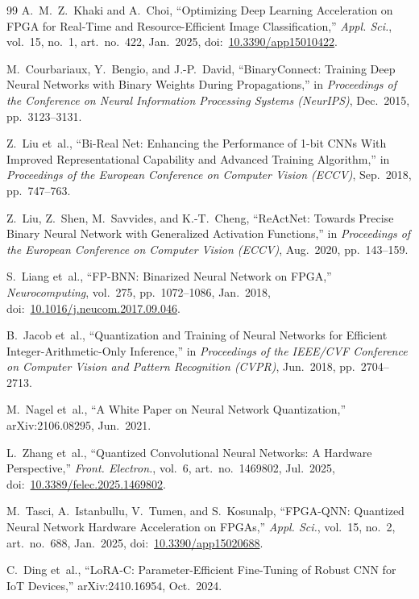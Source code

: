 \documentclass[journal]{IEEEtran}
\begin{document}
\begin{thebibliography}{99}
A.~M.~Z.~Khaki and A.~Choi,
``Optimizing Deep Learning Acceleration on FPGA for Real-Time and Resource-Efficient Image Classification,''
\emph{Appl. Sci.}, vol.~15, no.~1, art.~no.~422, Jan.~2025,
doi:~\url{10.3390/app15010422}.

M.~Courbariaux, Y.~Bengio, and J.-P.~David,
``BinaryConnect: Training Deep Neural Networks with Binary Weights During Propagations,''
in \emph{Proceedings of the Conference on Neural Information Processing Systems (NeurIPS)}, Dec.~2015, pp.~3123--3131.

Z.~Liu et~al.,
``Bi-Real Net: Enhancing the Performance of 1-bit CNNs With Improved Representational Capability and Advanced Training Algorithm,''
in \emph{Proceedings of the European Conference on Computer Vision (ECCV)}, Sep.~2018, pp.~747--763.

Z.~Liu, Z.~Shen, M.~Savvides, and K.-T.~Cheng,
``ReActNet: Towards Precise Binary Neural Network with Generalized Activation Functions,''
in \emph{Proceedings of the European Conference on Computer Vision (ECCV)}, Aug.~2020, pp.~143--159.

S.~Liang et~al.,
``FP-BNN: Binarized Neural Network on FPGA,''
\emph{Neurocomputing}, vol.~275, pp.~1072--1086, Jan.~2018,
doi:~\url{10.1016/j.neucom.2017.09.046}.

B.~Jacob et~al.,
``Quantization and Training of Neural Networks for Efficient Integer-Arithmetic-Only Inference,''
in \emph{Proceedings of the IEEE/CVF Conference on Computer Vision and Pattern Recognition (CVPR)}, Jun.~2018, pp.~2704--2713.


M.~Nagel et~al.,
``A White Paper on Neural Network Quantization,''
arXiv:2106.08295, Jun.~2021.

L.~Zhang et~al.,
``Quantized Convolutional Neural Networks: A Hardware Perspective,''
\emph{Front. Electron.}, vol.~6, art.~no.~1469802, Jul.~2025,
doi:~\url{10.3389/felec.2025.1469802}.

M.~Tasci, A.~Istanbullu, V.~Tumen, and S.~Kosunalp,
``FPGA-QNN: Quantized Neural Network Hardware Acceleration on FPGAs,''
\emph{Appl. Sci.}, vol.~15, no.~2, art.~no.~688, Jan.~2025,
doi:~\url{10.3390/app15020688}.

C.~Ding et~al.,
``LoRA-C: Parameter-Efficient Fine-Tuning of Robust CNN for IoT Devices,''
arXiv:2410.16954, Oct.~2024.


\end{thebibliography}
\end{document}
